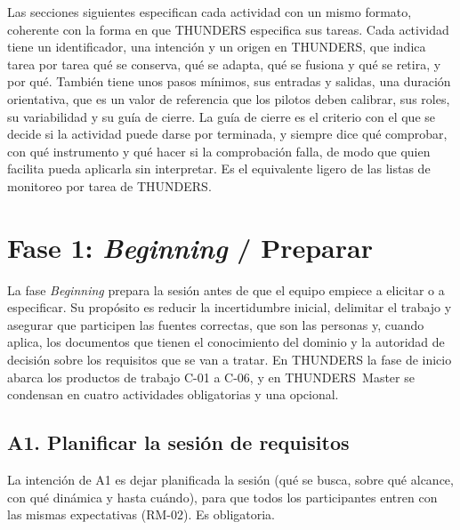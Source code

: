 \documentclass[12pt,letterpaper,oneside]{report}
\begin{document}
Las secciones siguientes especifican cada actividad con un mismo formato,
coherente con la forma en que THUNDERS especifica sus tareas. Cada actividad
tiene un identificador, una intención y un origen en THUNDERS, que indica tarea
por tarea qué se conserva, qué se adapta, qué se fusiona y qué se retira, y por
qué. También tiene unos pasos mínimos, sus entradas y salidas, una duración
orientativa, que es un valor de referencia que los pilotos deben calibrar, sus
roles, su variabilidad y su guía de cierre. La guía de cierre es el criterio con el que se
decide si la actividad puede darse por terminada, y siempre dice qué comprobar,
con qué instrumento y qué hacer si la comprobación falla, de modo que quien
facilita pueda aplicarla sin interpretar. Es el equivalente ligero de las listas
de monitoreo por tarea de THUNDERS.

\section{Fase 1: \textit{Beginning} / Preparar}
\label{sec:fase1}
La fase \textit{Beginning} prepara la sesión antes de que el equipo empiece a
elicitar o a especificar. Su propósito es reducir la incertidumbre inicial,
delimitar el trabajo y asegurar que participen las fuentes correctas, que son
las personas y, cuando aplica, los documentos que tienen el conocimiento del
dominio y la autoridad de decisión sobre los requisitos que se van a tratar. En
THUNDERS la fase de inicio abarca los productos de trabajo C-01 a C-06, y en
THUNDERS~Master se condensan en cuatro actividades obligatorias y una opcional.

\subsection{A1. Planificar la sesión de requisitos}
La intención de A1 es dejar planificada la sesión (qué se busca, sobre qué
alcance, con qué dinámica y hasta cuándo), para que todos los participantes
entren con las mismas expectativas (RM-02). Es obligatoria.
\end{document}
